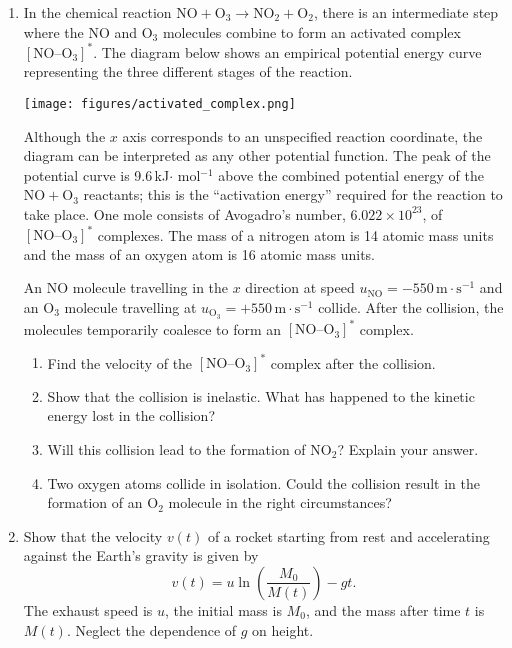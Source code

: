 \documentclass[12pt]{article}
\begin{document}
\begin{enumerate}
\item In the chemical reaction $\text{NO} + \text{O}_3 \rightarrow
  \text{NO}_2 + \text{O}_2$, there is an intermediate step where the
  $\text{NO}$ and $\text{O}_3$ molecules combine to form an activated
  complex $[\text{NO--O}_3]^{\ast}$. The diagram below shows an
  empirical potential energy curve representing the three different
  stages of the reaction.
  \begin{center}
    \texttt{[image: figures/activated\_complex.png]}
  \end{center}
  Although the $x$ axis corresponds to an unspecified reaction
  coordinate, the diagram can be interpreted as any other potential
  function. The peak of the potential curve is 9.6\,kJ$\cdot$ mol$^{-1}$
  above the combined potential energy of the $\text{NO} + \text{O}_3$
  reactants; this is the ``activation energy'' required for the reaction
  to take place. One mole consists of Avogadro's number, $6.022 \times
  10^{23}$, of $[\text{NO--O}_3]^{\ast}$ complexes. The mass of a
  nitrogen atom is 14 atomic mass units and the mass of an oxygen
  atom is 16 atomic mass units.

  \smallskip
  
  An $\text{NO}$ molecule travelling in the $x$ direction at speed
  $u_{\text{NO}} = -550\,\text{m}\cdot\text{s}^{-1}$ and an $\text{O}_3$
  molecule travelling at
  $u_{\text{O}_3} = +550\,\text{m}\cdot\text{s}^{-1}$ collide. After the
  collision, the molecules temporarily coalesce to form an
  $[\text{NO--O}_3]^{\ast}$ complex.
  \begin{enumerate}
  \item Find the velocity of the $[\text{NO--O}_3]^{\ast}$ complex
    after the collision.
  \item Show that the collision is inelastic. What has happened to the
    kinetic energy lost in the collision?
  \item Will this collision lead to the formation of $\text{NO}_2$?
    Explain your answer.
  \item Two oxygen atoms collide in isolation. Could the collision
    result in the formation of an $\text{O}_2$ molecule in the right
    circumstances?
  \end{enumerate}
  

\item Show that the velocity $v(t)$ of a rocket starting from rest and
  accelerating against the Earth's gravity is given by
  \begin{displaymath}
    v(t) = u\ln \left ( \frac{M_0}{M(t)} \right ) - gt.
  \end{displaymath}
  The exhaust speed is $u$, the initial mass is $M_0$, and the mass
  after time $t$ is $M(t)$. Neglect the dependence of $g$ on height.


\end{enumerate}
\end{document}
